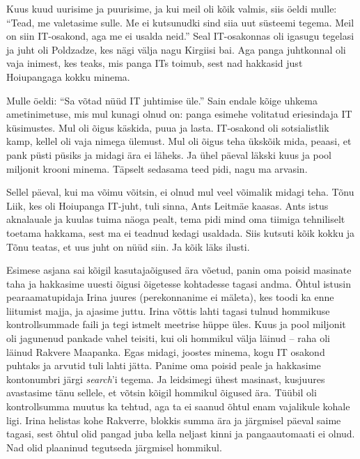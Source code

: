 Kuus kuud uurisime ja puurisime, ja kui meil oli kõik valmis, siis öeldi mulle: 
\enquote{Tead, me valetasime sulle. Me ei kutsunudki sind siia uut süsteemi 
tegema. Meil on siin IT-osakond, aga me ei usalda neid.} Seal IT-osakonnas 
oli igasugu tegelasi ja juht oli Poldzadze, kes nägi välja nagu Kirgiisi bai. Aga 
panga juhtkonnal oli vaja inimest, kes teaks, mis panga ITs toimub, sest nad 
hakkasid just Hoiupangaga kokku minema. 

Mulle öeldi: \enquote{Sa võtad nüüd IT juhtimise üle.} Sain endale kõige uhkema ametinimetuse, 
mis mul kunagi olnud on: panga esimehe 
volitatud eriesindaja IT küsimustes. Mul oli õigus käskida, puua ja lasta. 
IT-osakond oli sotsialistlik kamp, kellel oli vaja nimega ülemust. Mul oli õigus 
teha ükskõik mida, peaasi, et pank püsti püsiks ja midagi ära ei läheks. Ja 
ühel päeval läkski kuus ja pool miljonit krooni minema. Täpselt sedasama teed pidi, nagu 
ma arvasin. 

Sellel päeval, kui ma võimu võitsin, ei olnud mul veel võimalik midagi teha. 
Tõnu Liik, kes oli Hoiupanga IT-juht, tuli sinna, Ants 
Leitmäe kaasas. Ants istus aknalauale ja kuulas 
tuima näoga pealt, tema pidi mind oma tiimiga tehniliselt toetama hakkama, sest ma 
ei teadnud kedagi usaldada. Siis kutsuti kõik kokku ja Tõnu teatas, et 
uus juht on nüüd siin. Ja kõik läks ilusti. 

Esimese asjana sai kõigil 
kasutajaõigused ära võetud, panin oma poisid masinate taha ja hakkasime uuesti 
õigusi õigetesse kohtadesse tagasi andma. Õhtul istusin pearaamatupidaja Irina juures (perekonnanime ei mäleta), kes toodi ka enne liitumist majja, ja ajasime 
juttu. Irina võttis lahti tagasi tulnud hommikuse kontrollsummade faili 
ja tegi istmelt meetrise hüppe üles. Kuus ja pool miljonit oli jagunenud pankade 
vahel teisiti, kui oli hommikul välja läinud -- raha oli läinud Rakvere Maapanka. Egas midagi, 
joostes minema, kogu IT osakond puhtaks ja arvutid tuli lahti jätta. Panime oma poisid 
peale ja hakkasime kontonumbri järgi \emph{search}'i tegema. Ja leidsimegi ühest 
masinast, kusjuures avastasime tänu sellele, et võtsin kõigil hommikul 
õigused ära. Tüübil oli kontrollsumma muutus ka tehtud, aga ta ei saanud 
õhtul enam vajalikule kohale ligi. Irina helistas kohe Rakverre, blokkis summa 
ära ja järgmisel päeval saime tagasi, sest õhtul olid pangad juba kella neljast kinni ja pangaautomaati 
ei olnud. Nad olid plaaninud tegutseda järgmisel hommikul. 


